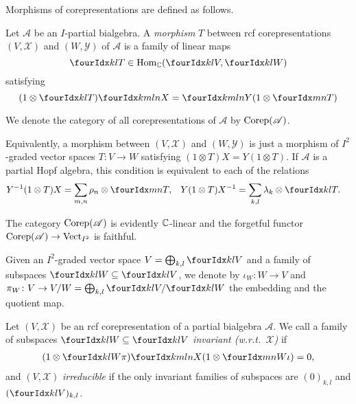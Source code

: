 Morphisms of corepresentations are defined as follows.
\begin{Def}
  Let $\mathscr{A}$ be an $I$-partial bialgebra.  A \emph{morphism}
  $T$ between rcf corepresentations
  $(V,\mathscr{X})$ and $(W,\mathscr{Y})$ of $\mathscr{A}$ is a family
  of linear maps
  \[\Gru{T}{k}{l} \in
  \Hom_\C(\Gru{V}{k}{l},\Gru{W}{k}{l})\] satisfying \[(1 \otimes
  \Gru{T}{k}{l})\Gr{X}{k}{l}{m}{n} = \Gr{Y}{k}{l}{m}{n}(1 \otimes
  \Gru{T}{m}{n})\]
\end{Def}
We denote the category of all corepresentations of $\mathscr{A}$ by
$\mathrm{Corep}(\mathscr{A})$.
\begin{Rem} \label{remark:rep-total-morphism}
 Equivalently, a morphism between
    $(V,\mathscr{X})$ and $(W,\mathscr{Y})$ is just a morphism of
    $I^{2}$-graded vector spaces $T\colon V\to W$ satisfying
    $(1\otimes T) X= Y(1 \otimes T)$. If $\mathscr{A}$ is  a
    partial Hopf algebra, this condition is equivalent to each of the relations
    \begin{align*}
      Y^{-1}(1 \otimes T)X&=\sum_{m,n} \rho_{n} \otimes \Gru{T}{m}{n},
      &
    Y(1\otimes T)X^{-1} &=\sum_{k,l} \lambda_{k} \otimes \Gru{T}{k}{l}.
    \end{align*}
\end{Rem}

The category $\mathrm{Corep}(\mathscr{A})$ is evidently $\mathbb{C}$-linear and the
forgetful functor $\mathrm{Corep}(\mathscr{A})\to \mathrm{Vect}_{I^{2}}$ is faithful.  

Given an $I^{2}$-graded vector space $V=\bigoplus_{k,l} \Gru{V}{k}{l}$
and a family of subspaces $\Gru{W}{k}{l} \subseteq \Gru{V}{k}{l}$, we
denote by $\iota_{W}\colon W\to V$ and $\pi_{W} \colon V \to
V/W=\bigoplus_{k,l} \Gru{V}{k}{l}/\Gru{W}{k}{l}$ the embedding and the
quotient map.
\begin{Def} Let $(V,\mathscr{X})$ be an rcf
  corepresentation of a partial bialgebra $\mathscr{A}$.  We call a
  family of subspaces $\Gru{W}{k}{l} \subseteq \Gru{V}{k}{l}$
  \emph{invariant (w.r.t.\ $\mathscr{X}$)} if
 \begin{align} \label{eq:rep-invariant} (1\otimes
   \Gr{\pi}{k}{l}{}{W})\Gr{X}{k}{l}{m}{n}(1 \otimes
   \Gr{\iota}{m}{n}{}{W}) =0,
  \end{align}
and $(V,\mathscr{X})$ 
 \emph{irreducible} if the only invariant families of subspaces are
 $(0)_{k,l}$ and $(\Gru{V}{k}{l})_{k,l}$.
\end{Def}


